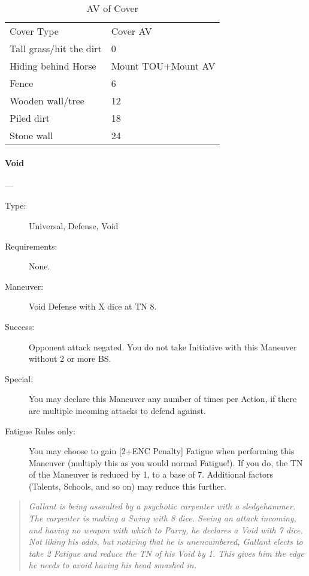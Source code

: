 \documentclass[oneside,11pt,english]{book}
\begin{document}
\begin{table}[!ht]
	\centering
	\caption{AV of Cover}
	\label{tab:Cover AV}
	\begin{tabu} spread 0pt{XX}
Cover Type& Cover AV\\
Tall grass/hit the dirt& 0\\
Hiding behind Horse& Mount TOU+Mount AV\\
Fence& 6\\
Wooden wall/tree& 12\\
Piled dirt& 18\\
Stone wall& 24\\
	\end{tabu}
\end{table}

\paragraph{\large\label{man:Void}Void}---
\vspace{-10pt}\begin{description} 
\item [Type:] Universal, Defense, Void 
\item [Requirements:] None. 
\item [Maneuver:] Void Defense with X dice at TN 8. 
\item [Success:] Opponent attack negated. You do not take Initiative with this Maneuver without 2 or more BS. 
\item [Special:] You may declare this Maneuver any number of times per Action, if there are multiple incoming 
attacks to defend against. 
\item [Fatigue Rules only:] You may choose to gain [2+ENC Penalty] Fatigue when performing this Maneuver 
(multiply this as you would normal Fatigue!). If you do, the TN of the Maneuver is reduced by 1, to a 
base of 7. Additional factors (Talents, Schools, and so on) may reduce this further. 
\end{description}
\begin{quotation}
\emph{Gallant is being assaulted by a psychotic carpenter with a sledgehammer. The carpenter is making a Swing with 8 dice. Seeing 
an attack incoming, and having no weapon with which to Parry, he declares a Void with 7 dice. Not liking his odds, but noticing 
that he is unencumbered, Gallant elects to take 2 Fatigue and reduce the TN of his Void by 1. This gives him the edge he needs to 
avoid having his head smashed in.}
\end{quotation}
\end{document}
